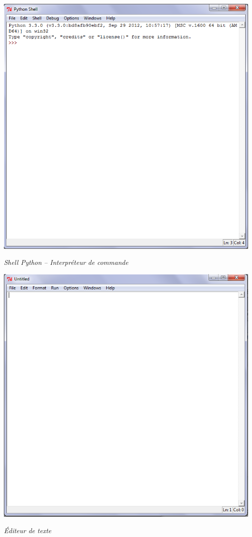 \documentclass[10pt]{article}
\begin{document}
\begin{minipage}[c]{.45\linewidth}
\begin{center}
\includegraphics[width=.9\textwidth]{images/shell}

\textit{Shell Python -- Interpréteur de commande}
\end{center}
\end{minipage} \hfill
\begin{minipage}[c]{.45\linewidth}
\begin{center}
\includegraphics[width=.9\textwidth]{images/editeur}

\textit{Éditeur de texte}
\end{center}
\end{minipage}
\end{document}
